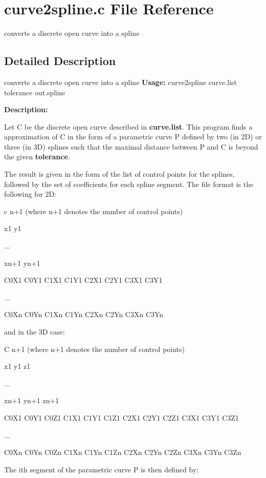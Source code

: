 \section{curve2spline.c File Reference}
\label{curve2spline_8c}


converts a discrete open curve into a spline  




\subsection{Detailed Description}
converts a discrete open curve into a spline {\bfseries Usage:} curve2spline curve.list tolerance out.spline

{\bfseries Description:}

Let C be the discrete open curve described in {\bfseries curve.list}. This program finds a approximation of C in the form of a parametric curve P defined by two (in 2D) or three (in 3D) splines such that the maximal distance between P and C is beyond the given {\bfseries tolerance}.

The result is given in the form of the list of control points for the splines, followed by the set of coefficients for each spline segment. The file format is the following for 2D:

c n+1 (where n+1 denotes the number of control points)\par
 x1 y1\par
 ...\par
 xn+1 yn+1\par
 C0X1 C0Y1 C1X1 C1Y1 C2X1 C2Y1 C3X1 C3Y1\par
 ...\par
 C0Xn C0Yn C1Xn C1Yn C2Xn C2Yn C3Xn C3Yn\par


and in the 3D case:

C n+1 (where n+1 denotes the number of control points)\par
 x1 y1 z1\par
 ...\par
 xn+1 yn+1 zn+1\par
 C0X1 C0Y1 C0Z1 C1X1 C1Y1 C1Z1 C2X1 C2Y1 C2Z1 C3X1 C3Y1 C3Z1\par
 ...\par
 C0Xn C0Yn C0Zn C1Xn C1Yn C1Zn C2Xn C2Yn C2Zn C3Xn C3Yn C3Zn\par


The ith segment of the parametric curve P is then defined by:

